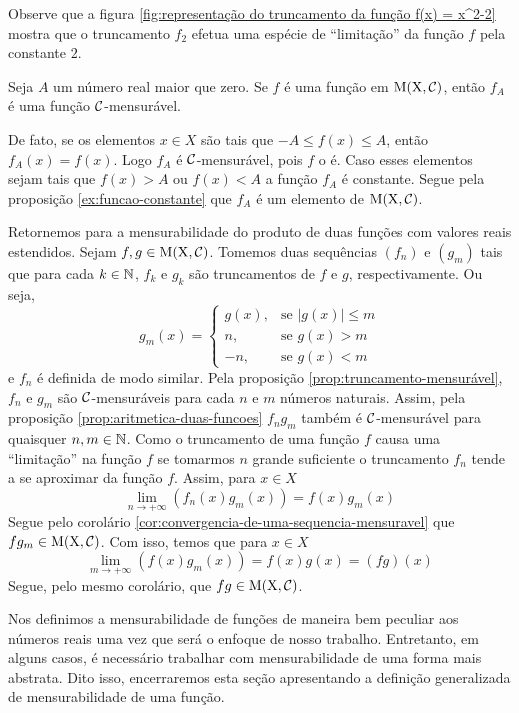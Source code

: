 	Observe que a figura \ref{fig:representação do truncamento da função f(x) = x^2-2} mostra que o truncamento $f_2$ efetua uma espécie de \enquote{limitação} da função $f$ pela constante $2$.

\begin{proposition}
	\label{prop:truncamento-mensurável}
	Seja $A$ um número real maior que zero.
	Se $f$ é uma função em $\operatorname{M(X, \mathcal{C} )}$, então $f_A$ é uma função $\operatorname{\mathcal{C}}$-mensurável.
\end{proposition}
\begin{prova}
	De fato, se os elementos $x \in X$ são tais que $-A \leq f(x) \leq A$, então $f_A(x) = f(x)$.
	Logo $f_A$ é $\operatorname{\mathcal{C}}$-mensurável, pois $f$ o é.
	Caso esses elementos sejam tais que $f(x) > A$ ou $f(x) <A$ a função $f_A$ é constante.
	Segue pela proposição \ref{ex:funcao-constante} que $f_A$ é um elemento de $\operatorname{M(X, \mathcal{C} )}$.
\end{prova}

Retornemos para a mensurabilidade do produto de duas funções com valores reais estendidos.
Sejam $f,g \in \operatorname{M(X, \mathcal{C} )}$. 
Tomemos duas sequências $(f_n)$ e $(g_m)$ tais que para cada $k \in \operatorname{\mathbb{N}}$, $f_k$ e $g_k$ são truncamentos de $f$ e $g$, respectivamente.
Ou seja, 
	$$ g_m(x) =
		\left\{\begin{array}{cc}
			g(x), & \textrm{se\ } |g(x)| \leq m \\
			n, & \textrm{se\ } g(x) > m \\
			-n, & \textrm{se\ } g(x) < m 
		\end{array}\right.	
	$$
e $f_n$ é definida de modo similar.
Pela proposição \ref{prop:truncamento-mensurável}, $f_n$ e $g_m$ são $\operatorname{\mathcal{C}}$-mensuráveis para cada $n$ e $m$ números naturais.
Assim, pela proposição \ref{prop:aritmetica-duas-funcoes} $f_ng_m$ também é $\operatorname{\mathcal{C}}$-mensurável para quaisquer $n, m \in \operatorname{\mathbb{N}}$.
Como o truncamento de uma função $f$ causa uma \enquote{limitação} na função $f$ se tomarmos $n$ grande suficiente o truncamento $f_n$ tende a se aproximar da função $f$.
Assim, para $x \in X$
$$
\lim_{n \to +\infty} \left(f_n(x)g_m(x)\right) = f(x)g_m(x) 
$$
Segue pelo corolário \ref{cor:convergencia-de-uma-sequencia-mensuravel} que 
$fg_m \in \operatorname{M(X, \mathcal{C} )}$. Com isso, temos que para $x \in X$
$$
\lim_{m \to +\infty} \left(f(x)g_m(x)\right) 
= f(x)g(x) = (fg)(x)
$$
Segue, pelo mesmo corolário, que $fg \in \operatorname{M(X, \mathcal{C} )}$.

Nos definimos a mensurabilidade de funções de maneira bem peculiar aos números reais uma vez que será o enfoque de nosso trabalho.
Entretanto, em alguns casos, é necessário trabalhar com mensurabilidade de uma forma mais abstrata.
Dito isso, encerraremos esta seção apresentando a definição generalizada de mensurabilidade de uma função.

